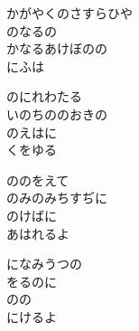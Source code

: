 \documentclass[10pt,b5j]{tarticle} %
\begin{document}
\vspace{1.5em} %
\newcommand{\linespace}{0.5em} %
\newcommand{\blocksize}{0.5\hsize} %
\begin{enumerate} %
    \begin{minipage}[c]{\blocksize}
    
        \vspace{\linespace}
        \item
        かがやくのさすらひや\\
        のなるの\\
        かなるあけぼのの\\
        にふは
        
        \vspace{\linespace}
        \item
        のにれわたる\\
        いのちののおきの\\
        のえはに\\
        くをゆる
        
        \vspace{\linespace}
        \item
        ののをえて\\
        のみのみちすぢに\\
        のけばに\\
        あはれるよ
        
        \vspace{\linespace}
        \item
        になみうつの\\
        をるのに\\
        のの\\
        にけるよ
    
    \end{minipage}
\end{enumerate} %
\end{document}
